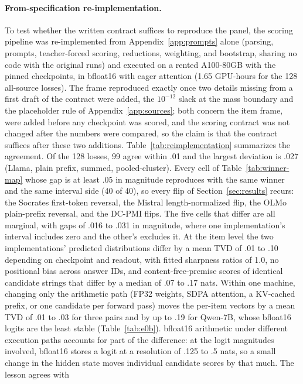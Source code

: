 \documentclass[11pt]{article}
\begin{document}
\paragraph{From-specification re-implementation.}
To test whether the written contract suffices to reproduce the panel, the
scoring pipeline was re-implemented from Appendix~\ref{app:prompts} alone
(parsing, prompts, teacher-forced scoring, reductions, weighting, and
bootstrap, sharing no code with the original runs) and executed on a rented
A100-80GB with the pinned checkpoints, in bfloat16 with eager attention (1.65
GPU-hours for the 128 all-source losses). The frame reproduced exactly once
two details missing from a first draft of the contract were added, the
$10^{-12}$ slack at the mass boundary and the placeholder rule of
Appendix~\ref{app:sources}; both concern the item frame, were added before
any checkpoint was scored, and the scoring contract was not changed after
the numbers were compared, so the claim is that the contract suffices after
these two additions. Table~\ref{tab:reimplementation} summarizes the
agreement. Of the 128 losses, 99 agree within .01 and the largest deviation
is .027 (Llama, plain prefix, summed, pooled-cluster). Every cell of
Table~\ref{tab:winner-map} whose gap is at least .05 in magnitude reproduces
with the same winner and the same interval side (40 of 40), so every flip of
Section~\ref{sec:results} recurs: the Socrates first-token reversal, the
Mistral length-normalized flip, the OLMo plain-prefix reversal, and the DC-PMI
flips. The five cells that differ are all marginal, with gaps of .016 to .031
in magnitude, where one implementation's interval includes zero and the
other's excludes it. At the item level the two implementations' predicted
distributions differ by a mean TVD of .01 to .10 depending on checkpoint and
readout, with fitted sharpness ratios of 1.0, no positional bias across answer
IDs, and content-free-premise scores of identical candidate strings that
differ by a median of .07 to .17 nats. Within one machine, changing only the
arithmetic path (FP32 weights, SDPA attention, a KV-cached prefix, or one
candidate per forward pass) moves the per-item vectors by a mean TVD of .01
to .03 for three pairs and by up to .19 for Qwen-7B, whose bfloat16 logits
are the least stable (Table~\ref{tab:e0b}). bfloat16 arithmetic under different execution paths accounts for part of the difference: at the logit magnitudes involved, bfloat16 stores a
logit at a resolution of .125 to .5 nats, so a small change in the hidden
state moves individual candidate scores by that much. The lesson agrees with
\end{document}
